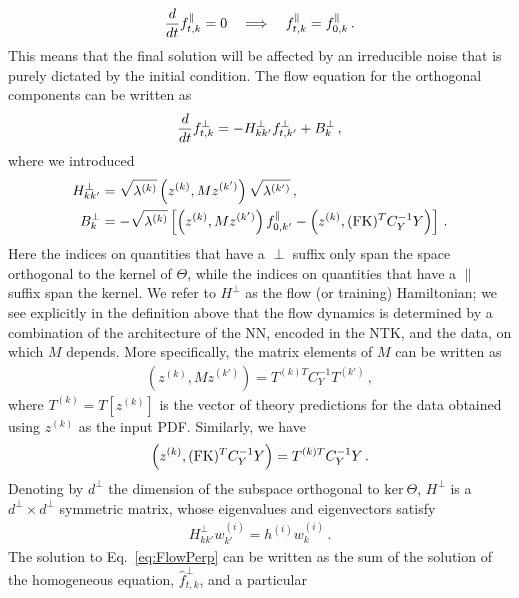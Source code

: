 \begin{align}
    \label{eq:FlowParallel}
    \frac{d}{dt} f^\parallel_{t,k} = 0
        \quad \Longrightarrow \quad f^\parallel_{t,k} = f^\parallel_{0,k}\, .
\end{align}
This means that the final solution will be affected by an irreducible noise that
is purely dictated by the initial condition. The flow equation for the
orthogonal components can be written as
\begin{align}
    \label{eq:FlowPerp}
    \frac{d}{dt} f^\perp_{t,k} = - H^\perp_{kk'} f^\perp_{t,k'}
        + B^\perp_{k}\, ,
\end{align}
where  we introduced
\begin{align}
    H^\perp_{kk'} &= \sqrt{\lambda^{(k)}} \left(z^{(k)}, M z^{(k')}\right) \sqrt{\lambda^{(k')}}\, ,\\
    B^\perp_k &= -\sqrt{\lambda^{(k)}} \left[\left(z^{(k)}, M z^{(k')}\right) f^\parallel_{0,k'}
        - \left(z^{(k)}, (\mathrm{FK})^T C_Y^{-1} Y\right)\right]\, .
\end{align}
Here the indices on quantities that have a $\perp$ suffix only span the space
orthogonal to the kernel of $\Theta$, while the indices on quantities that have
a $\parallel$ suffix span the kernel. We refer to $H^\perp$ as the flow (or
training) Hamiltonian; we see explicitly in the definition above that the flow
dynamics is determined by a combination of the architecture of the NN, encoded
in the NTK, and the data, on which $M$ depends. More specifically, the matrix
elements of $M$ can be written as
\begin{align}
    \label{eq:MMatElems}
    \left(z^{(k)}, M z^{(k')}\right) = T^{(k)T} C_Y^{-1} T^{(k')}\, ,
\end{align}
where $T^{(k)} = T[z^{(k)}]$ is the vector of theory predictions for the data
obtained using $z^{(k)}$ as the input PDF. Similarly, we have
\begin{align}
    \label{eq:BMatElems}
    \left(z^{(k)}, (\mathrm{FK})^T C_Y^{-1} Y\right) = T^{(k)T} C_Y^{-1} Y\, .
\end{align}
Denoting by $d^\perp$ the dimension of the subspace orthogonal to $\text{ker}\
\Theta$, $H^\perp$ is a $d^\perp\times d^\perp$ symmetric matrix, whose
eigenvalues and eigenvectors satisfy
\begin{align}
    H^\perp_{kk'} w^{(i)}_{k'} = h^{(i)} w^{(i)}_{k}\, .
\end{align}
The solution to Eq.~\eqref{eq:FlowPerp} can be written as the sum of the
solution of the homogeneous equation, $\hat{f}^{\perp}_{t,k}$, and a particular

